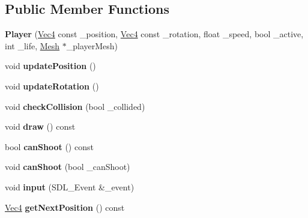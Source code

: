 \subsection*{Public Member Functions}
\begin{DoxyCompactItemize}
\item 
{\bfseries Player} (\hyperlink{classVec4}{Vec4} const \+\_\+position, \hyperlink{classVec4}{Vec4} const \+\_\+rotation, float \+\_\+speed, bool \+\_\+active, int \+\_\+life, \hyperlink{classMesh}{Mesh} $\ast$\+\_\+player\+Mesh)\hypertarget{classPlayer_aea2cc909f6edf32535322dc2e50e706d}{}\label{classPlayer_aea2cc909f6edf32535322dc2e50e706d}

\item 
void {\bfseries update\+Position} ()\hypertarget{classPlayer_a1cb7ff18fe3b07cc1dcd27519bde8329}{}\label{classPlayer_a1cb7ff18fe3b07cc1dcd27519bde8329}

\item 
void {\bfseries update\+Rotation} ()\hypertarget{classPlayer_a13b4bc20dd8e661bd091684a77e62762}{}\label{classPlayer_a13b4bc20dd8e661bd091684a77e62762}

\item 
void {\bfseries check\+Collision} (bool \+\_\+collided)\hypertarget{classPlayer_a2ce46af4329b7dd62de5314cfdf68d02}{}\label{classPlayer_a2ce46af4329b7dd62de5314cfdf68d02}

\item 
void {\bfseries draw} () const \hypertarget{classPlayer_aa1df31ab187c296318bb2ca09237e010}{}\label{classPlayer_aa1df31ab187c296318bb2ca09237e010}

\item 
bool {\bfseries can\+Shoot} () const \hypertarget{classPlayer_aea39f9314e03fe306eb46492ca441c8b}{}\label{classPlayer_aea39f9314e03fe306eb46492ca441c8b}

\item 
void {\bfseries can\+Shoot} (bool \+\_\+can\+Shoot)\hypertarget{classPlayer_ab01c82bacc9fe74dc30a278984cb30a8}{}\label{classPlayer_ab01c82bacc9fe74dc30a278984cb30a8}

\item 
void {\bfseries input} (S\+D\+L\+\_\+\+Event \&\+\_\+event)\hypertarget{classPlayer_aab63aa497bf58ad86b83f79568fd8763}{}\label{classPlayer_aab63aa497bf58ad86b83f79568fd8763}

\item 
\hyperlink{classVec4}{Vec4} {\bfseries get\+Next\+Position} () const \hypertarget{classPlayer_a86231b2071b967960041afb4578dc484}{}\label{classPlayer_a86231b2071b967960041afb4578dc484}


\end{DoxyCompactItemize}
